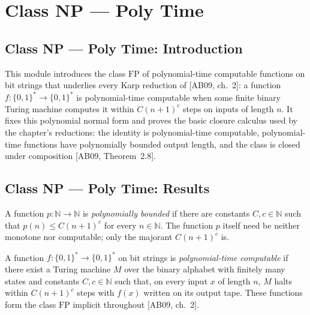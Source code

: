 \section{Class NP --- Poly Time}
\subsection*{Class NP --- Poly Time: Introduction}

This module introduces the class $\mathrm{FP}$ of polynomial-time computable functions on
bit strings that underlies every Karp reduction of [AB09, ch.~2]: a function
$f : \{0,1\}^* \to \{0,1\}^*$ is polynomial-time computable when some finite binary Turing
machine computes it within $C(n+1)^c$ steps on inputs of length $n$. It fixes this
polynomial normal form and proves the basic closure calculus used by the chapter's
reductions: the identity is polynomial-time computable, polynomial-time functions have
polynomially bounded output length, and the class is closed under composition
[AB09, Theorem~2.8].

\subsection*{Class NP --- Poly Time: Results}

\begin{definition}
\label{Complexity.PolyBound}
\leanok
A function $p : \mathbb{N} \to \mathbb{N}$ is \emph{polynomially bounded} if there are
constants $C, c \in \mathbb{N}$ such that $p(n) \le C(n+1)^c$ for every $n \in \mathbb{N}$.
The function $p$ itself need be neither monotone nor computable; only the majorant
$C(n+1)^c$ is.
\end{definition}

\begin{definition}
\label{Complexity.PolyTimeComputable}
\leanok
{}
A function $f : \{0,1\}^* \to \{0,1\}^*$ on bit strings is \emph{polynomial-time computable}
if there exist a Turing machine $M$ over the binary alphabet with finitely many states and
constants $C, c \in \mathbb{N}$ such that, on every input $x$ of length $n$, $M$ halts within
$C(n+1)^c$ steps with $f(x)$ written on its output tape. These functions form the class
$\mathrm{FP}$ implicit throughout [AB09, ch.~2].
\end{definition}

